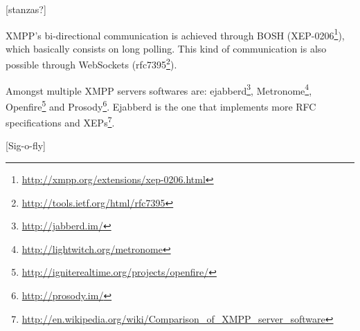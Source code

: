{\color{magenta} [stanzas?]}

  \ac{XMPP}'s bi-directional communication is achieved through \ac{BOSH} (XEP-0206\footnote{\url{http://xmpp.org/extensions/xep-0206.html}}), which basically consists on long polling. This kind of communication is also possible through WebSockets (rfc7395\footnote{\url{http://tools.ietf.org/html/rfc7395}}).

  Amongst multiple XMPP servers softwares are: ejabberd\footnote{\url{http://jabberd.im/}}, Metronome\footnote{\url{http://lightwitch.org/metronome}}, Openfire\footnote{\url{http://igniterealtime.org/projects/openfire/}} and Prosody\footnote{\url{http://prosody.im/}}. Ejabberd is the one that implements more \ac{RFC} specifications and \ac{XEP}s\footnote{\url{http://en.wikipedia.org/wiki/Comparison_of_XMPP_server_software}}.

  {\color{red}[Sig-o-fly]}
